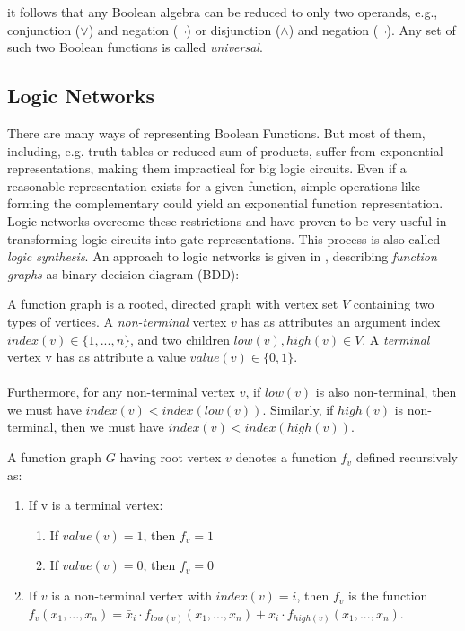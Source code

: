 it follows that any Boolean algebra can be reduced to only two operands, e.g., conjunction ($\vee$) and negation ($\neg$) or disjunction ($\wedge$) and negation ($\neg$). Any set of such two Boolean functions is called \textit{universal}.

\subsection{Logic Networks}

There are many ways of representing Boolean Functions. But most of them, including, e.g. truth tables or reduced sum of products, suffer from exponential representations, making them impractical for big logic circuits. Even if a reasonable representation exists for a given function, simple operations like forming the complementary could yield an exponential function representation. Logic networks overcome these restrictions and have proven to be very useful in transforming logic circuits into gate representations. This process is also called \textit{logic synthesis}. An approach to logic networks is given in \cite{LogicNetwork}, describing \textit{function graphs} as binary decision diagram (BDD):

\begin{definition}
	A function graph is a rooted, directed graph with vertex set $V$ containing two types of vertices. A \textit{non-terminal} vertex $v$ has as attributes an argument index $index(v) \in \{1, . . .,n\}$, and two children $low(v),high(v) \in V$. A \textit{terminal} vertex v has as attribute a value $value(v)\in\{0,1\}$.\\
	\\
	Furthermore, for any non-terminal vertex $v$, if $low(v)$ is also non-terminal, then we must have
	$index(v) < index(low(v))$. Similarly, if $high(v)$ is non-terminal, then we must have
	$index(v) < index(high(v))$.
\end{definition}

\begin{definition}
	A function graph $G$ having root vertex $v$ denotes a function $f_v$ defined recursively as:
	\begin{enumerate}
		\item If v is a terminal vertex:
		\begin{enumerate}
			\item If $value(v)=1$, then $f_v=1$
			\item If $value(v)=0$, then $f_v=0$
		\end{enumerate}
		\item If $v$ is a non-terminal vertex with $index(v)=i$, then $f_v$ is the function \\ 
		$f_v(x_1, ..., x_n) = \bar{x}_i \cdot f_{low(v)}(x_1, ..., x_n) + x_i \cdot f_{high(v)}(x_1, ..., x_n)$.
	\end{enumerate}
\end{definition}

